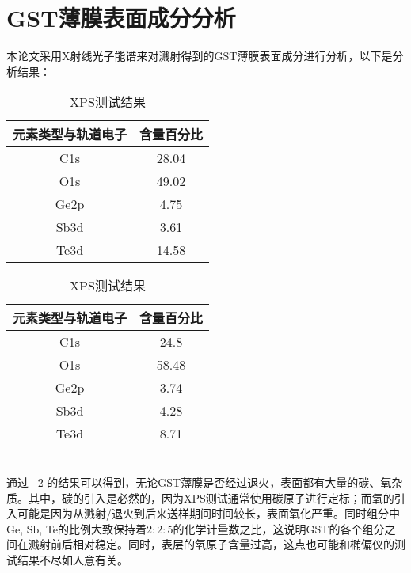\section{GST薄膜表面成分分析}
\label{sub:test_XPS}
本论文采用X射线光子能谱来对溅射得到的GST薄膜表面成分进行分析，以下是分析结果：
\begin{table}[htbp]
\centering
\caption{XPS测试结果}
\label{tab:subtable}
{
\begin{tabular}{|c|c|}
\toprule[1.5pt]
元素类型与轨道电子 & 含量百分比 \\
\midrule[1pt]
C1s & 28.04 \\
\hline
O1s & 49.02 \\
\hline
Ge2p & 4.75 \\
\hline
Sb3d & 3.61 \\
\hline
Te3d & 14.58 \\
\bottomrule[1.5pt]
\end{tabular}
}
\hskip1cm
{
\begin{tabular}{|c|c|}
\toprule[1.5pt]
元素类型与轨道电子 & 含量百分比 \\
\midrule[1pt]
C1s & 24.8 \\
\hline
O1s & 58.48 \\
\hline
Ge2p & 3.74 \\
\hline
Sb3d & 4.28 \\
\hline
Te3d & 8.71 \\
\bottomrule[1.5pt]
\end{tabular}
}
\end{table}
\\
通过 ~\ref{tab:subtable} 的结果可以得到，无论GST薄膜是否经过退火，表面都有大量的碳、氧杂质。其中，碳的引入是必然的，因为XPS测试通常使用碳原子进行定标；而氧的引入可能是因为从溅射/退火到后来送样期间时间较长，表面氧化严重。同时组分中Ge, Sb, Te的比例大致保持着$2:2:5$的化学计量数之比，这说明GST的各个组分之间在溅射前后相对稳定。同时，表层的氧原子含量过高，这点也可能和椭偏仪的测试结果不尽如人意有关。